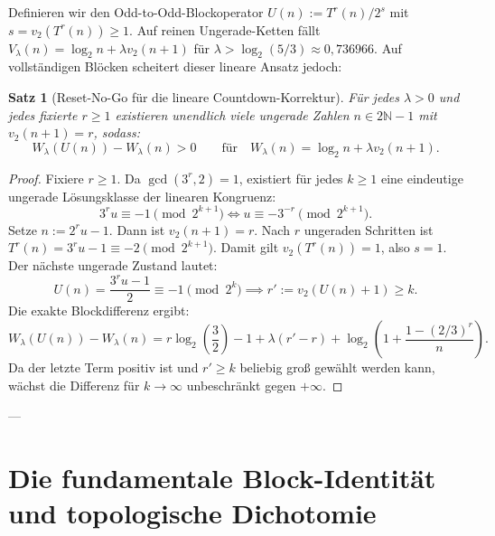 \documentclass[11pt,reqno]{amsart}
\newtheorem{theorem}{Satz}[section]
\theoremstyle{definition}
\theoremstyle{remark}
\numberwithin{equation}{section}
\begin{document}
Definieren wir den Odd-to-Odd-Blockoperator $U(n) := T^r(n) / 2^s$ mit $s = v_2(T^r(n)) \ge 1$. Auf reinen Ungerade-Ketten f\"allt $V_\lambda(n) = \log_2 n + \lambda v_2(n+1)$ f\"ur $\lambda > \log_2(5/3) \approx 0{,}736966$. Auf vollst\"andigen Bl\"ocken scheitert dieser lineare Ansatz jedoch:

\begin{theorem}[Reset-No-Go f\"ur die lineare Countdown-Korrektur]
\label{thm:reset_nogo}
F\"ur jedes $\lambda > 0$ und jedes fixierte $r \ge 1$ existieren unendlich viele ungerade Zahlen $n \in 2\mathbb{N}-1$ mit $v_2(n+1) = r$, sodass:
\begin{equation}
W_\lambda(U(n)) - W_\lambda(n) > 0 \qquad \text{f\"ur} \quad W_\lambda(n) = \log_2 n + \lambda v_2(n+1).
\end{equation}
\end{theorem}

\begin{proof}
Fixiere $r \ge 1$. Da $\gcd(3^r, 2) = 1$, existiert f\"ur jedes $k \ge 1$ eine eindeutige ungerade L\"osungsklasse der linearen Kongruenz:
\begin{equation}
3^r u \equiv -1 \pmod{2^{k+1}} \iff u \equiv -3^{-r} \pmod{2^{k+1}}.
\end{equation}
Setze $n := 2^r u - 1$. Dann ist $v_2(n+1) = r$. Nach $r$ ungeraden Schritten ist $T^r(n) = 3^r u - 1 \equiv -2 \pmod{2^{k+1}}$.
Damit gilt $v_2(T^r(n)) = 1$, also $s = 1$. 
Der n\"achste ungerade Zustand lautet:
\begin{equation}
U(n) = \frac{3^r u - 1}{2} \equiv -1 \pmod{2^k} \implies r' := v_2(U(n) + 1) \ge k.
\end{equation}
Die exakte Blockdifferenz ergibt:
\begin{equation}
W_\lambda(U(n)) - W_\lambda(n) = r \log_2\left(\frac{3}{2}\right) - 1 + \lambda(r' - r) + \log_2\left(1 + \frac{1 - (2/3)^r}{n}\right).
\end{equation}
Da der letzte Term positiv ist und $r' \ge k$ beliebig gro\ss{} gew\"ahlt werden kann, w\"achst die Differenz f\"ur $k \to \infty$ unbeschr\"ankt gegen $+\infty$.
\end{proof}

---

\section{Die fundamentale Block-Identit\"at und topologische Dichotomie}
\end{document}
